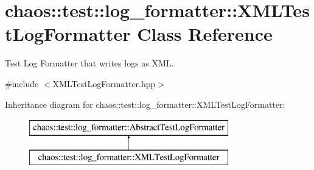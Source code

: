 \hypertarget{classchaos_1_1test_1_1log__formatter_1_1_x_m_l_test_log_formatter}{\section{chaos\-:\-:test\-:\-:log\-\_\-formatter\-:\-:X\-M\-L\-Test\-Log\-Formatter Class Reference}
\label{classchaos_1_1test_1_1log__formatter_1_1_x_m_l_test_log_formatter}
}


Test Log Formatter that writes logs as X\-M\-L.  




{\ttfamily \#include $<$X\-M\-L\-Test\-Log\-Formatter.\-hpp$>$}

Inheritance diagram for chaos\-:\-:test\-:\-:log\-\_\-formatter\-:\-:X\-M\-L\-Test\-Log\-Formatter\-:\begin{figure}[H]
\begin{center}
\leavevmode
\includegraphics[height=2.000000cm]{classchaos_1_1test_1_1log__formatter_1_1_x_m_l_test_log_formatter}
\end{center}
\end{figure}
